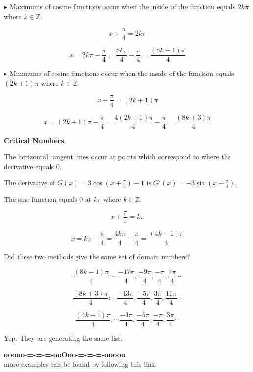 \documentclass{ximera}
\begin{document}
\begin{example}
$\blacktriangleright$ Maximums of cosine functions occur when the inside of the function equals $2 k \pi$ where $k \in \mathbb{Z}$.


\[
x + \frac{\pi}{4} = 2 k \pi
\]

\[
x = 2 k \pi - \frac{\pi}{4} = \frac{8 k \pi}{4} - \frac{\pi}{4} = \frac{(8k - 1)\pi}{4}
\]




$\blacktriangleright$ Minimums of cosine functions occur when the inside of the function equals $(2 k + 1) \pi$ where $k \in \mathbb{Z}$.


\[
x + \frac{\pi}{4} = (2 k + 1) \pi
\]

\[
x = (2 k + 1) \pi - \frac{\pi}{4} = \frac{4(2 k + 1) \pi}{4} - \frac{\pi}{4} = \frac{(8k + 3)\pi}{4}
\]











\textbf{\textcolor{blue!55!black}{Critical Numbers}} 


The horizontal tangent lines occur at points which correspond to where the derivative equals $0$.  






The derivative of $G(x) = 3 \cos\left( x + \frac{\pi}{4} \right) - 1$ is $G'(x) = -3 \sin\left( x + \frac{\pi}{4} \right)$.


The sine function equals $0$ at $k \pi$ where $k \in \mathbb{Z}$.



\[
x + \frac{\pi}{4} =  k \pi
\]


\[
x  =    k \pi - \frac{\pi}{4} =  \frac{4 k \pi}{4} - \frac{\pi}{4} = \frac{(4k - 1)\pi}{4}
\]










Did these two methods give the same set of domain numbers? 



\[
\frac{(8k - 1)\pi}{4} :  \cdots \frac{-17\pi}{4}, \frac{-9\pi}{4}, \frac{-\pi}{4}, \frac{7\pi}{4} \cdots
\]

\[
\frac{(8k + 3)\pi}{4} :  \cdots \frac{-13\pi}{4}, \frac{-5\pi}{4}, \frac{3\pi}{4}, \frac{11\pi}{4} \cdots
\]


\[
\frac{(4k - 1)\pi}{4} :  \cdots \frac{-9\pi}{4}, \frac{-5\pi}{4}, \frac{-\pi}{4}, \frac{3\pi}{4} \cdots
\]



Yep.  They are generating the same list.


\end{example}











\begin{center}
\textbf{\textcolor{green!50!black}{ooooo-=-=-=-ooOoo-=-=-=-ooooo}} \\

more examples can be found by following this link\\ 

\end{center}
\end{document}
